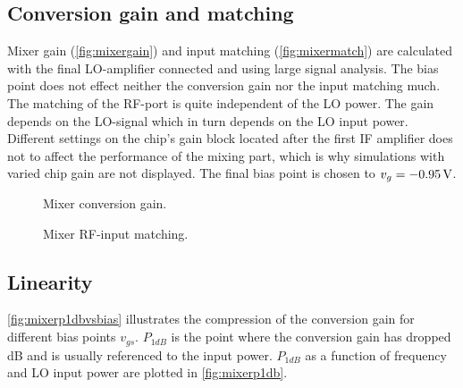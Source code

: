 		\subsection{Conversion gain and matching}
			Mixer gain (\autoref{fig:mixergain}) and input matching (\autoref{fig:mixermatch}) are calculated with the final LO-amplifier connected and using large signal analysis. The bias point does not effect neither the conversion gain nor the input matching much. The matching of the RF-port is quite independent of the LO power. The gain depends on the LO-signal which in turn depends on the LO input power. Different settings on the chip's gain block located after the first IF amplifier does not to affect the performance of the mixing part, which is why simulations with varied chip gain are not displayed. The final bias point is chosen to $v_g=\unit[-0.95]{V}$.

			\begin{figure}[hbt!]
				\centering
				\caption[Mixer conversion gain.]{Mixer conversion gain.}\label{fig:mixergain}
			\end{figure}

			\begin{figure}[hbt!]
				\centering
				\caption[Mixer RF-input matching.]{Mixer RF-input matching.}\label{fig:mixermatch}
			\end{figure}

		\subsection{Linearity}
			\autoref{fig:mixerp1dbvsbias} illustrates the compression of the conversion gain for different bias points $v_{gs}$. $P_{1dB}$ is the point where the conversion gain has dropped \unit[1]{dB} and is usually referenced to the input power. $P_{1dB}$ as a function of frequency and LO input power are plotted in \autoref{fig:mixerp1db}.

